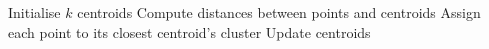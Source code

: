 \begin{algorithmic}[1]
    \State Initialise $k$ centroids
	\Repeat
		\State Compute distances between points and centroids
		\State Assign each point to its closest centroid's cluster
		\State Update centroids
\EndProcedure
\end{algorithmic}